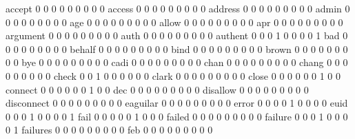 \documentclass[compress,8pt]{beamer}
\begin{document}
\begin{frame}
\begin{Schunk}
  accept                                     0   0   0   0   0   0   0   0   0
  access                                     0   0   0   0   0   0   0   0   0
  address                                    0   0   0   0   0   0   0   0   0
  admin                                      0   0   0   0   0   0   0   0   0
  age                                        0   0   0   0   0   0   0   0   0
  allow                                      0   0   0   0   0   0   0   0   0
  apr                                        0   0   0   0   0   0   0   0   0
  argument                                   0   0   0   0   0   0   0   0   0
  auth                                       0   0   0   0   0   0   0   0   0
  authent                                    0   0   0   1   0   0   0   0   1
  bad                                        0   0   0   0   0   0   0   0   0
  behalf                                     0   0   0   0   0   0   0   0   0
  bind                                       0   0   0   0   0   0   0   0   0
  brown                                      0   0   0   0   0   0   0   0   0
  bye                                        0   0   0   0   0   0   0   0   0
  cadi                                       0   0   0   0   0   0   0   0   0
  chan                                       0   0   0   0   0   0   0   0   0
  chang                                      0   0   0   0   0   0   0   0   0
  check                                      0   0   1   0   0   0   0   0   0
  clark                                      0   0   0   0   0   0   0   0   0
  close                                      0   0   0   0   0   0   1   0   0
  connect                                    0   0   0   0   0   0   1   0   0
  dec                                        0   0   0   0   0   0   0   0   0
  disallow                                   0   0   0   0   0   0   0   0   0
  disconnect                                 0   0   0   0   0   0   0   0   0
  eaguilar                                   0   0   0   0   0   0   0   0   0
  error                                      0   0   0   0   1   0   0   0   0
  euid                                       0   0   0   1   0   0   0   0   1
  fail                                       0   0   0   0   0   1   0   0   0
  failed                                     0   0   0   0   0   0   0   0   0
  failure                                    0   0   0   1   0   0   0   0   1
  failures                                   0   0   0   0   0   0   0   0   0
  feb                                        0   0   0   0   0   0   0   0   0

\end{Schunk}
\end{frame}
\end{document}
